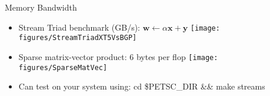 \begin{frame}[shrink=1]{Memory Bandwidth}
\begin{itemize}
\item Stream Triad benchmark (GB/s): $\bm w \gets \alpha \bm x + \bm y$
\texttt{[image: figures/StreamTriadXT5VsBGP]} \\
\item Sparse matrix-vector product: 6 bytes per flop
\texttt{[image: figures/SparseMatVec]} \\
\item Can test on your system using: {\kb cd \$PETSC\_DIR \&\& make streams}
\end{itemize}
\end{frame}
